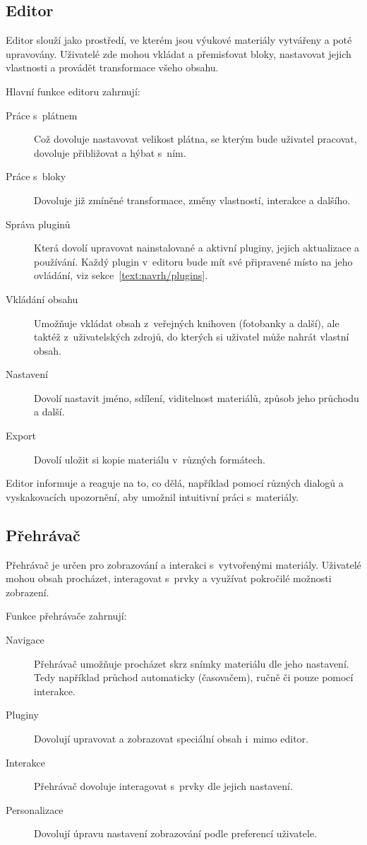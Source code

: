 \subsection{Editor}

Editor slouží jako prostředí, ve kterém jsou výukové materiály vytvářeny a poté upravovány. 
Uživatelé zde mohou vkládat a přemisťovat bloky, nastavovat jejich vlastnosti a provádět transformace všeho obsahu.

Hlavní funkce editoru zahrnují:
\begin{description}
    \item[Práce s~plátnem] Což dovoluje nastavovat velikost plátna, se kterým bude uživatel pracovat, dovoluje přibližovat a hýbat s~ním.
    \item[Práce s~bloky] Dovoluje již zmíněné transformace, změny vlastností, interakce a dalšího.
    \item[Správa pluginů] Která dovolí upravovat nainstalované a aktivní pluginy, jejich aktualizace a používání. Každý plugin v~editoru bude mít své připravené místo na jeho ovládání, viz sekce~\ref{text:navrh/plugins}.
    \item[Vkládání obsahu] Umožňuje vkládat obsah z~veřejných knihoven (fotobanky a další), ale taktéž z~uživatelských zdrojů, do kterých si uživatel může nahrát vlastní obsah.
    \item[Nastavení] Dovolí nastavit jméno, sdílení, viditelnost materiálů, způsob jeho průchodu a další.
    \item[Export] Dovolí uložit si kopie materiálu v~různých formátech.
\end{description}

Editor informuje a reaguje na to, co dělá, například pomocí různých dialogů a vyskakovacích upozornění, aby umožnil intuitivní práci s~materiály.

\subsection{Přehrávač}

Přehrávač je určen pro zobrazování a interakci s~vytvořenými materiály. 
Uživatelé mohou obsah procházet, interagovat s~prvky a využívat pokročilé možnosti zobrazení.

Funkce přehrávače zahrnují:

\begin{description}
    \item[Navigace] Přehrávač umožňuje procházet skrz snímky materiálu dle jeho nastavení. Tedy například průchod automaticky (časovačem), ručně či pouze pomocí interakce.
    \item[Pluginy] Dovolují upravovat a zobrazovat speciální obsah i~mimo editor.
    \item[Interakce] Přehrávač dovoluje interagovat s~prvky dle jejich nastavení.
    \item[Personalizace] Dovolují úpravu nastavení zobrazování podle preferencí uživatele.
\end{description}

